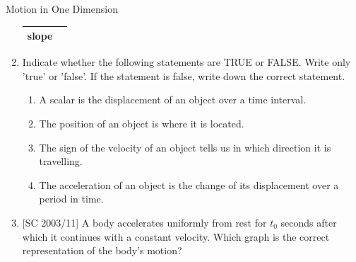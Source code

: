 \begin{eocexercises}{Motion in One Dimension}
\begin{enumerate}[noitemsep, label=\textbf{\arabic*}. ]
\begin{table}[H]
\begin{center}
\begin{tabular}{|l|l|}
        slope \\ \hline
    \end{tabular}
      \end{center}
\end{table}
    \par
          \label{m38796*uid181}\item Indicate whether the following statements are TRUE or FALSE. Write only 'true' or 'false'. If the statement is false, write down the correct statement.
\label{m38796*id81564}\begin{enumerate}[noitemsep, label=\textbf{\alph*}. ] 
            \label{m38796*uid182}\item A scalar is the displacement of an object over a time interval.
\label{m38796*uid183}\item The position of an object is where it is located.
\label{m38796*uid184}\item The sign of the velocity of an object tells us in which direction it is travelling.
\label{m38796*uid185}\item The acceleration of an object is the change of its displacement over a period in time.
\end{enumerate}
\item{[SC 2003/11] A body accelerates uniformly from rest for $t_0$ seconds after which it continues with a constant velocity. Which graph is the correct representation of the body's motion?

}
\end{enumerate}
\end{eocexercises}
